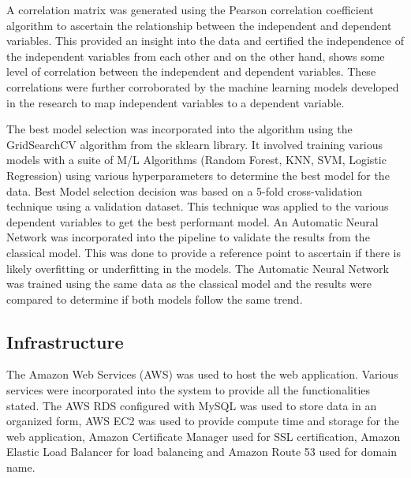 A correlation matrix was generated using the Pearson correlation coefficient algorithm to ascertain the relationship between the independent and dependent 
variables. This provided an insight into the data and certified the independence of the independent variables from each other and on the other hand, shows
some level of correlation between the independent and dependent variables. These correlations were further corroborated by the machine learning models 
developed in the research to map independent variables to a dependent variable.

The best model selection was incorporated into the algorithm using the GridSearchCV algorithm from the sklearn library. It involved training various models with
a suite of M/L Algorithms (Random Forest, KNN, SVM, Logistic Regression) using various hyperparameters to determine the best model for the data. Best Model
selection decision was based on a 5-fold cross-validation technique using a validation dataset. This technique was applied to the various dependent variables
to get the best performant model. An Automatic Neural Network was incorporated into the pipeline to validate the results from the classical model. This 
was done to provide a reference point to ascertain if there is likely overfitting or underfitting in the models. The Automatic Neural Network was trained
using the same data as the classical model and the results were compared to determine if both models follow the same trend. 

\subsection{Infrastructure}
The Amazon Web Services (AWS) was used to host the web application. Various services were incorporated into the system to provide all the functionalities
stated. The AWS RDS configured with MySQL was used to store data in an organized form, AWS EC2 was used to provide compute time and storage for the web
application, Amazon Certificate Manager used for SSL certification, Amazon Elastic Load Balancer for load balancing and Amazon Route 53 used for domain name. 

